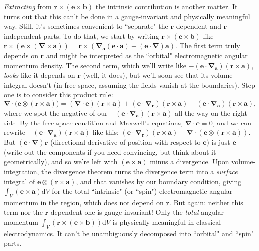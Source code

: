 \documentclass[12pt]{article}
\renewcommand{\vv}[1]{\mathbf{#1}}
\newcommand{\dd}[1]{\mathrm{d}#1}
\newcommand{\del}{\boldsymbol{\nabla}}
\begin{document}
\emph{Extracting} from $\vv r \times (\vv e \times \vv b)$ the intrinsic contribution is another matter. It turns out that this can't be done in a gauge-invariant and physically meaningful way. Still, it's sometimes convenient to ``separate" the $\vv r$-dependent and $\vv r$-independent parts. To do that, we start by writing $\vv r \times (\vv e \times \vv b)$ like $\vv r \times (\vv e \times (\del \times \vv a)) = \vv r \times (\del_{\vv a} (\vv e \cdot \vv a) - (\vv e \cdot \del) \vv a)$. The first term truly depends on $\vv r$ and might be interpreted as the ``orbital" electromagnetic angular momentum density. The second term, which we'll write like $- ( \vv e \cdot \del_{\vv a} ) ( \vv r \times \vv a )$, \emph{looks} like it depends on $\vv r$ (well, it does), but we'll soon see that its volume-integral doesn't (in free space, assuming the fields vanish at the boundaries). Step one is to consider this product rule:
\begin{equation*}
\del \cdot \bigl( \vv e \otimes \left( \vv r \times \vv a \right)  \bigr) = \left( \del \cdot \vv e \right) \left( \vv r \times \vv a \right) + \left( \vv e \cdot \del_{\vv r} \right) \left( \vv r \times \vv a \right) +  \left( \vv e \cdot \del_{\vv a} \right) \left( \vv r \times \vv a \right) ,
\end{equation*}
where we spot the negative of our $- ( \vv e \cdot \del_{\vv a} ) ( \vv r \times \vv a )$ all the way on the right side. By the free-space condition and Maxwell's equations, $\del \cdot \vv e = 0$, and we can rewrite $- ( \vv e \cdot \del_{\vv a} ) ( \vv r \times \vv a )$ like this: $ ( \vv e \cdot \del_{\vv r} ) ( \vv r \times \vv a ) - \del \cdot ( \vv e \otimes ( \vv r \times \vv a ) )$. But $(\vv e \cdot \del)\vv r$ (directional derivative of position with respect to $\vv e$) is just $\vv e$ (write out the components if you need convincing, but think about it geometrically), and so we're left with $(\vv e \times \vv a)$ minus a divergence. Upon volume-integration, the divergence theorem turns the divergence term into a \emph{surface} integral of $\vv e \otimes ( \vv r \times \vv a )$, and that vanishes by our boundary condition, giving $\int_V (\vv e \times \vv a) \dd V$ for the total ``intrinsic" (or ``spin") electromagnetic angular momentum in the region, which does not depend on $\vv r$. But again: neither this term nor the $\vv r$-dependent one is gauge-invariant! Only the \emph{total} angular momentum $\int_V (\vv r \times (\vv e \times \vv b)) \dd V$ is physically meaningful in classical electrodynamics. It can't be unambiguously decomposed into ``orbital" and ``spin" parts.
\end{document}
